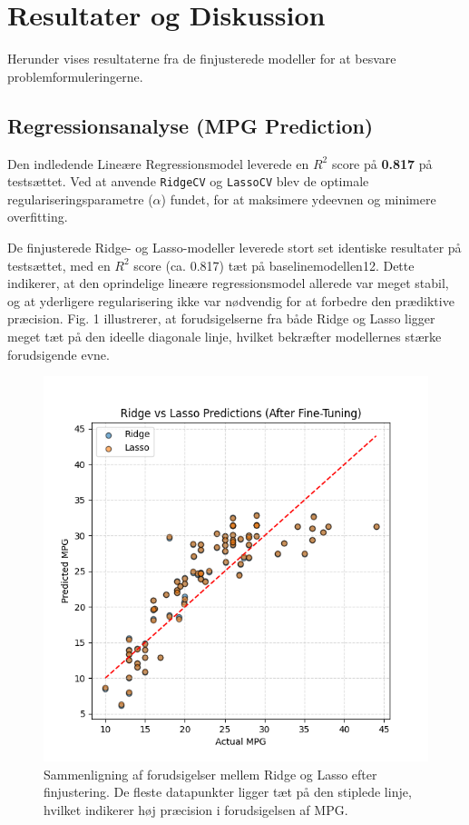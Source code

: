 \documentclass{article}
\begin{document}
\section{Resultater og Diskussion}

Herunder vises resultaterne fra de finjusterede modeller for at besvare problemformuleringerne.

\subsection{Regressionsanalyse (MPG Prediction)}

Den indledende Lineære Regressionsmodel leverede en $R^2$ score på \textbf{0.817} på testsættet. 
Ved at anvende \texttt{RidgeCV} og \texttt{LassoCV} blev de optimale regulariseringsparametre (\(\alpha\)) fundet, for at maksimere ydeevnen og minimere overfitting.

De finjusterede Ridge- og Lasso-modeller leverede stort set identiske resultater på testsættet, med en $R^2$ score (ca. 0.817) tæt på baselinemodellen12. 
Dette indikerer, at den oprindelige lineære regressionsmodel allerede var meget stabil, og at yderligere regularisering ikke var nødvendig for at forbedre den prædiktive præcision. 
Fig. 1 illustrerer, at forudsigelserne fra både Ridge og Lasso ligger meget tæt på den ideelle diagonale linje, hvilket bekræfter modellernes stærke forudsigende evne.

\begin{figure}[h]
    \centering
    \includegraphics[width=0.75\columnwidth]{../models/ridge_vs_lasso_after_finetuning.png}
    \caption{Sammenligning af forudsigelser mellem Ridge og Lasso efter finjustering. De fleste datapunkter ligger tæt på den stiplede linje, hvilket indikerer høj præcision i forudsigelsen af MPG.}
    \label{fig:regression}
\end{figure}
\end{document}
